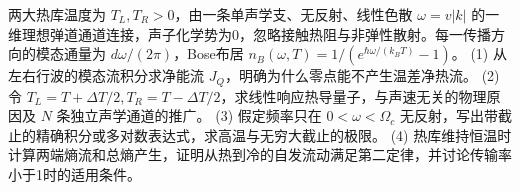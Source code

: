 两大热库温度为 \(T_L,T_R>0\)，由一条单声学支、无反射、线性色散 \(\omega=v|k|\) 的一维理想弹道通道连接，声子化学势为0，忽略接触热阻与非弹性散射。每一传播方向的模态通量为 \(d\omega/(2\pi)\)，Bose布居 \(n_B(\omega,T)=1/(e^{\hbar\omega/(k_BT)}-1)\)。
(1) 从左右行波的模态流积分求净能流 \(J_Q\)，明确为什么零点能不产生温差净热流。
(2) 令 \(T_L=T+\Delta T/2,T_R=T-\Delta T/2\)，求线性响应热导量子，与声速无关的物理原因及 \(N\) 条独立声学通道的推广。
(3) 假定频率只在 \(0<\omega<\Omega_c\) 无反射，写出带截止的精确积分或多对数表达式，求高温与无穷大截止的极限。
(4) 热库维持恒温时计算两端熵流和总熵产生，证明从热到冷的自发流动满足第二定律，并讨论传输率小于1时的适用条件。
